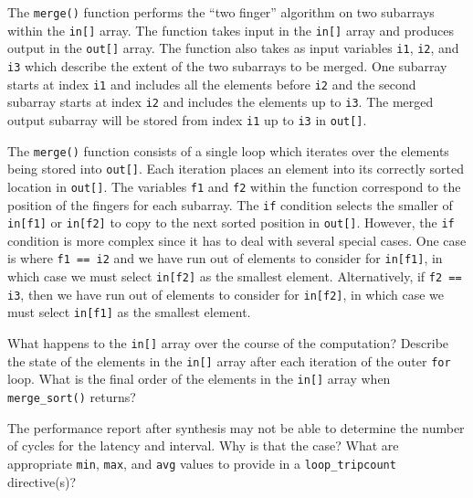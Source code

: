 The \lstinline{merge()} function performs the ``two finger'' algorithm on two subarrays within the \lstinline{in[]} array.  The function takes input in the \lstinline{in[]} array and produces output in the \lstinline{out[]} array. The function also takes as input variables \lstinline{i1}, \lstinline{i2}, and \lstinline{i3} which describe the extent of the two subarrays to be merged.  One subarray starts at index \lstinline{i1} and includes all the elements before \lstinline{i2} and the second subarray starts at index \lstinline{i2} and includes the elements up to \lstinline{i3}.  The merged output subarray will be stored from index \lstinline{i1} up to \lstinline{i3} in \lstinline{out[]}. 

The \lstinline{merge()} function consists of a single loop which iterates over the elements being stored into \lstinline{out[]}.  Each iteration places an element into its correctly sorted location in \lstinline{out[]}. The variables \lstinline{f1} and \lstinline{f2} within the function correspond to the position of the fingers for each subarray.  The \lstinline{if} condition selects the smaller of \lstinline{in[f1]} or \lstinline{in[f2]} to copy to the next sorted position in 
\lstinline{out[]}.  However, the \lstinline{if} condition is more complex since it has to deal with several special cases.  One case is where \lstinline{f1 == i2} and we have run out of elements to consider for \lstinline{in[f1]}, in which case we must select \lstinline{in[f2]} as the smallest element.  Alternatively, if \lstinline{f2 == i3}, then we  have run out of elements to consider for \lstinline{in[f2]}, in which case we must select \lstinline{in[f1]} as the smallest element.

\begin{exercise}
What happens to the \lstinline{in[]} array over the course of the computation? Describe the state of the elements in the \lstinline{in[]} array after each iteration of the outer \lstinline{for} loop. What is the final order of the elements in the \lstinline{in[]} array when \lstinline{merge_sort()} returns?
\end{exercise}

\begin{exercise}
The performance report after synthesis may not be able to determine the number of cycles for the latency and interval. Why is that the case? What are appropriate  \lstinline{min}, \lstinline{max}, and \lstinline{avg} values to provide in a \lstinline{loop_tripcount} directive(s)?
\end{exercise}

